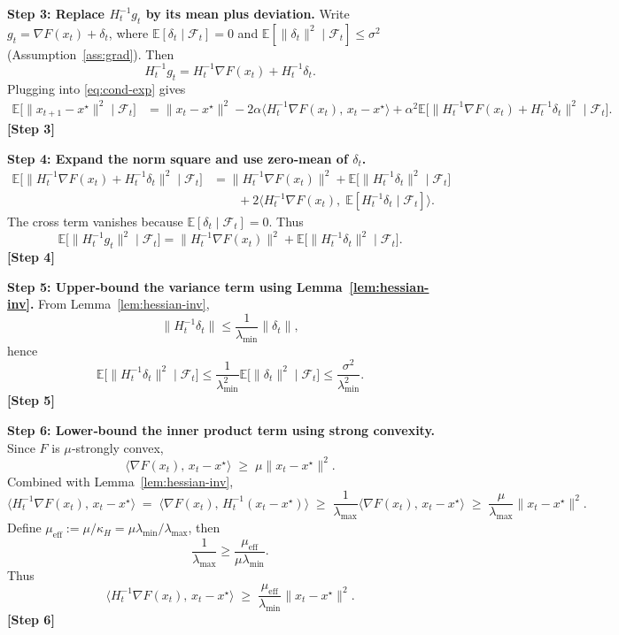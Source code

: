\documentclass{article}
\begin{document}
\bigskip
\noindent\textbf{Step 3: Replace $H_t^{-1}g_t$ by its mean plus deviation.}  
Write $g_t=\nabla F(x_t)+\delta_t$, where $\mathbb{E}[\delta_t\mid\mathcal{F}_t]=0$ and $\mathbb{E}[\|\delta_t\|^2\mid\mathcal{F}_t]\le\sigma^2$ (Assumption~\ref{ass:grad}).  Then
\[
H_t^{-1}g_t = H_t^{-1}\nabla F(x_t) + H_t^{-1}\delta_t .
\]
Plugging into \eqref{eq:cond-exp} gives
\begin{align}
\mathbb{E}\!\big[\|x_{t+1}-x^\star\|^2\mid\mathcal{F}_t\big]
&= \|x_t-x^\star\|^2
   -2\alpha\langle H_t^{-1}\nabla F(x_t),\,x_t-x^\star\rangle
   +\alpha^2\mathbb{E}\!\big[\|H_t^{-1}\nabla F(x_t)+H_t^{-1}\delta_t\|^2\mid\mathcal{F}_t\big].
\label{eq:split}
\end{align}
\textbf{[Step 3]}

\bigskip
\noindent\textbf{Step 4: Expand the norm square and use zero‑mean of $\delta_t$.}
\begin{align}
\mathbb{E}\!\big[\|H_t^{-1}\nabla F(x_t)+H_t^{-1}\delta_t\|^2\mid\mathcal{F}_t\big]
&= \|H_t^{-1}\nabla F(x_t)\|^2
   +\mathbb{E}\!\big[\|H_t^{-1}\delta_t\|^2\mid\mathcal{F}_t\big] \nonumber\\
&\qquad +2\langle H_t^{-1}\nabla F(x_t),\;\mathbb{E}[H_t^{-1}\delta_t\mid\mathcal{F}_t]\rangle .
\end{align}
The cross term vanishes because $\mathbb{E}[\delta_t\mid\mathcal{F}_t]=0$.
Thus
\begin{equation}
\mathbb{E}\!\big[\|H_t^{-1}g_t\|^2\mid\mathcal{F}_t\big]
= \|H_t^{-1}\nabla F(x_t)\|^2
  +\mathbb{E}\!\big[\|H_t^{-1}\delta_t\|^2\mid\mathcal{F}_t\big].
\label{eq:norm-split}
\end{equation}
\textbf{[Step 4]}

\bigskip
\noindent\textbf{Step 5: Upper‑bound the variance term using Lemma~\ref{lem:hessian-inv}.}
From Lemma~\ref{lem:hessian-inv},
\[
\|H_t^{-1}\delta_t\| \le \frac{1}{\lambda_{\min}}\|\delta_t\|,
\]
hence
\[
\mathbb{E}\!\big[\|H_t^{-1}\delta_t\|^2\mid\mathcal{F}_t\big]
\le \frac{1}{\lambda_{\min}^2}\mathbb{E}\!\big[\|\delta_t\|^2\mid\mathcal{F}_t\big]
\le \frac{\sigma^2}{\lambda_{\min}^2}.
\]
\textbf{[Step 5]}

\bigskip
\noindent\textbf{Step 6: Lower‑bound the inner product term using strong convexity.}  
Since $F$ is $\mu$‑strongly convex,
\[
\langle \nabla F(x_t),\,x_t-x^\star\rangle \;\ge\; \mu\|x_t-x^\star\|^2 .
\]
Combined with Lemma~\ref{lem:hessian-inv},
\[
\langle H_t^{-1}\nabla F(x_t),\,x_t-x^\star\rangle
\;=\; \langle \nabla F(x_t),\,H_t^{-1}(x_t-x^\star)\rangle
\;\ge\; \frac{1}{\lambda_{\max}}\langle \nabla F(x_t),\,x_t-x^\star\rangle
\;\ge\; \frac{\mu}{\lambda_{\max}}\|x_t-x^\star\|^2 .
\]
Define $\mu_{\mathrm{eff}}:=\mu/\kappa_H=\mu\lambda_{\min}/\lambda_{\max}$, then
\[
\frac{1}{\lambda_{\max}} \ge \frac{\mu_{\mathrm{eff}}}{\mu\lambda_{\min}} .
\]
Thus
\[
\langle H_t^{-1}\nabla F(x_t),\,x_t-x^\star\rangle
\;\ge\; \frac{\mu_{\mathrm{eff}}}{\lambda_{\min}}\|x_t-x^\star\|^2 .
\]
\textbf{[Step 6]}
\end{document}
